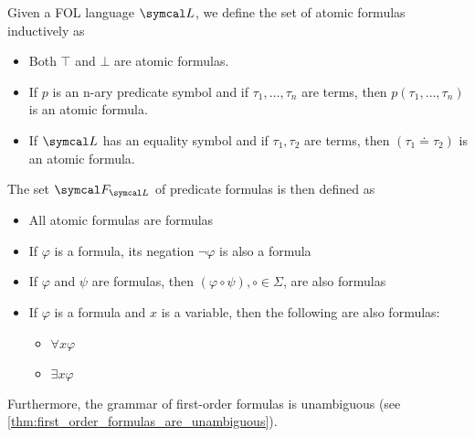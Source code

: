 \begin{definition}\label{def:first_order_formula}\cite[definition 2.5]{Nerode2012}
  Given a FOL language \( \Cal{L} \), we define the set of atomic formulas inductively as
  \begin{itemize}
    \item Both \( \top \) and \( \bot \) are atomic formulas.
    \item If \( p \) is an n-ary predicate symbol and if \( \tau_1, \ldots, \tau_n \) are terms, then \( p(\tau_1, \ldots, \tau_n) \) is an atomic formula.
    \item If \( \Cal{L} \) has an equality symbol and if \( \tau_1, \tau_2 \) are terms, then \( (\tau_1 \doteq \tau_2) \) is an atomic formula.
  \end{itemize}

  The set \( \Cal{F}_{\Cal{L}} \) of predicate formulas is then defined as
  \begin{itemize}
    \item All atomic formulas are formulas
    \item If \( \varphi \) is a formula, its negation \( \neg \varphi \) is also a formula
    \item If \( \varphi \) and \( \psi \) are formulas, then \( (\varphi \circ \psi), \circ \in \Sigma \), are also formulas
    \item If \( \varphi \) is a formula and \( x \) is a variable, then the following are also formulas:
    \begin{itemize}
      \item \( \forall x \varphi \)
      \item \( \exists x \varphi \)
    \end{itemize}
  \end{itemize}

  Furthermore, the grammar of first-order formulas is unambiguous (see \cref{thm:first_order_formulas_are_unambiguous}).


\end{definition}
